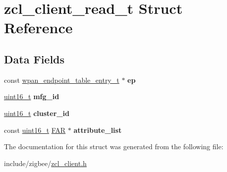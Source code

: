 \hypertarget{structzcl__client__read__t}{}\section{zcl\+\_\+client\+\_\+read\+\_\+t Struct Reference}
\label{structzcl__client__read__t}
\subsection*{Data Fields}
\begin{DoxyCompactItemize}
\item 
const \hyperlink{structwpan__endpoint__table__entry__t}{wpan\+\_\+endpoint\+\_\+table\+\_\+entry\+\_\+t} $\ast$ {\bfseries ep}
\item 
\hyperlink{group__hal__dos_ga5a8b2dc9e45a9ee81a94ef304fb62505}{uint16\+\_\+t} {\bfseries mfg\+\_\+id}
\item 
\hyperlink{group__hal__dos_ga5a8b2dc9e45a9ee81a94ef304fb62505}{uint16\+\_\+t} {\bfseries cluster\+\_\+id}
\item 
const \hyperlink{group__hal__dos_ga5a8b2dc9e45a9ee81a94ef304fb62505}{uint16\+\_\+t} \hyperlink{group__hal_gaef060b3456fdcc093a7210a762d5f2ed}{F\+AR} $\ast$ {\bfseries attribute\+\_\+list}
\end{DoxyCompactItemize}


The documentation for this struct was generated from the following file\+:\begin{DoxyCompactItemize}
\item 
include/zigbee/\hyperlink{zcl__client_8h}{zcl\+\_\+client.\+h}\end{DoxyCompactItemize}
